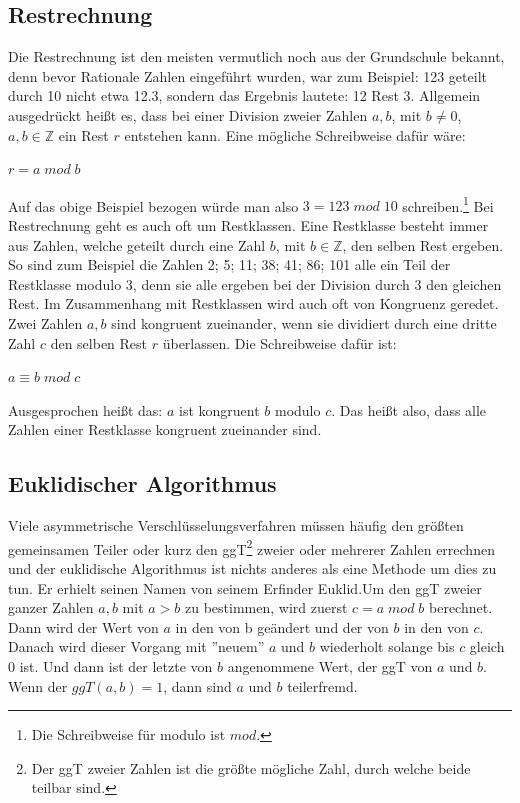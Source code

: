 \documentclass[a4paper,12pt,titlepage]{article}
\begin{document}
\subsection{Restrechnung}
Die Restrechnung ist den meisten vermutlich noch aus der Grundschule bekannt, denn bevor Rationale Zahlen eingeführt wurden, war zum Beispiel: 123 geteilt durch 10 nicht etwa 12.3, sondern das Ergebnis lautete: 12 Rest 3. Allgemein ausgedrückt heißt es, dass bei einer Division zweier Zahlen $a,b$, mit $b \neq 0$, $a,b \in \mathbb{Z}$ ein Rest $r$ entstehen kann. Eine mögliche Schreibweise dafür wäre: 
\begin{center}
$r = a \; mod \; b$
\end{center}
Auf das obige Beispiel bezogen würde man also $3 = 123 \; mod \; 10$ schreiben.\footnote{Die Schreibweise für modulo ist $mod$.} \newline Bei Restrechnung geht es auch oft um Restklassen. Eine Restklasse besteht immer aus Zahlen, welche geteilt durch eine Zahl $b$, mit $b \in \mathbb{Z}$, den selben Rest ergeben. So sind zum Beispiel die Zahlen 2; 5; 11; 38; 41; 86; 101 alle ein Teil der Restklasse modulo 3, denn sie alle ergeben bei der Division durch 3 den gleichen Rest. Im Zusammenhang mit Restklassen wird auch oft von Kongruenz geredet. Zwei Zahlen $a, b$ sind kongruent zueinander, wenn sie dividiert durch eine dritte Zahl $c$ den selben Rest $r$ überlassen. Die Schreibweise dafür ist:
 \begin{center}
$a \equiv b \; mod \; c$
 \end{center}
Ausgesprochen heißt das: $a$ ist kongruent $b$ modulo $c$.
Das heißt also, dass alle Zahlen einer Restklasse kongruent zueinander sind.

\subsection{Euklidischer Algorithmus}
Viele asymmetrische Verschlüsselungsverfahren müssen häufig den größten gemeinsamen Teiler oder kurz den ggT\footnote{Der ggT zweier Zahlen ist die größte mögliche Zahl, durch welche beide teilbar sind.} zweier oder mehrerer Zahlen errechnen und der euklidische Algorithmus ist nichts anderes als eine Methode um dies zu tun. Er erhielt seinen Namen von seinem Erfinder Euklid.\newline Um den ggT zweier ganzer Zahlen $a, b$ mit $a > b$ zu bestimmen, wird zuerst $c = a \; mod \; b$ berechnet. Dann wird der Wert von $a$ in den von b geändert und der von $b$ in den von $c$. Danach wird dieser Vorgang mit ''neuem'' $a$ und $b$ wiederholt solange bis $c$ gleich 0 ist. Und dann ist der letzte von $b$ angenommene Wert, der ggT von $a$ und $b$.
Wenn der $ggT(a, b) = 1$, dann sind $a$ und $b$ teilerfremd.
\end{document}
